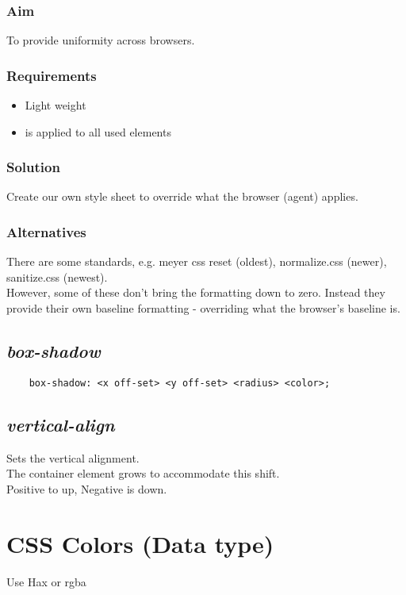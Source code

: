 \documentclass[]{article}
\newcommand{\<}{\guilsinglleft}
\renewcommand{\>}{\guilsinglright}
\renewcommand{\it}[1]{\textit{#1}}
\begin{document}
\subsubsection{Aim}
To provide uniformity across browsers.
\subsubsection{Requirements}
\begin{itemize}
	\item Light weight
	\item is applied to all used elements
\end{itemize}
\subsubsection{Solution}
Create our own style sheet to override what the browser (agent) applies.
\subsubsection{Alternatives}
There are some standards, e.g. meyer css reset (oldest), normalize.css (newer), sanitize.css (newest).  
\\
However, some of these don't bring the formatting down to zero.  Instead they provide their own baseline formatting - overriding what the browser's baseline is.

\subsection{\it{box-shadow}}
\begin{lstlisting}
    box-shadow: <x off-set> <y off-set> <radius> <color>;
\end{lstlisting}

\subsection{\it{vertical-align}}
Sets the vertical alignment.\\
The container element grows to accommodate this shift.\\
Positive to up, Negative is down.

\section{CSS Colors (Data type)}
Use Hax or rgba
\end{document}

